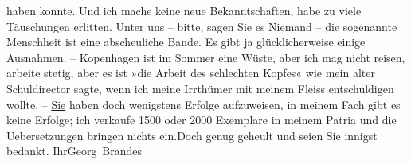                haben konnte. Und ich mache keine neue Bekanntschaften, habe zu viele Täuschungen
               erlitten. Unter uns – bitte, sagen Sie es Niemand – die sogenannte Menschheit ist
               eine abscheuliche Bande. Es gibt ja glücklicherweise einige Ausnahmen. – Kopenhagen ist im Sommer eine Wüste, aber ich
               mag nicht reisen, arbeite stetig, aber es ist »die Arbeit des schlechten Kopfes« wie
               mein alter Schuldirector
               sagte, wenn ich meine Irrthümer mit meinem Fleiss entschuldigen wollte. – \uline{Sie} haben doch wenigstens Erfolge aufzuweisen, in
               meinem Fach gibt es keine Erfolge; ich verkaufe 1500 oder 2000 Exemplare in meinem
               Patria und die Uebersetzungen bringen nichts ein.\hspace*{2em}Doch genug geheult und seien Sie innigst bedankt. Ihr\spacefill\mbox{Georg Brandes}\pend
           \endnumbering{}  
      